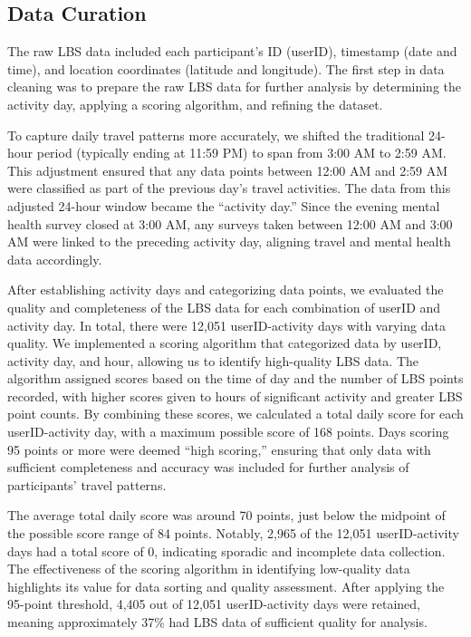 \documentclass[
  letterpaper,
  number,
  review,
  3p]{elsarticle}
\begin{document}
\subsection{Data Curation}\label{data-curation}

The raw LBS data included each participant's ID (userID), timestamp
(date and time), and location coordinates (latitude and longitude). The
first step in data cleaning was to prepare the raw LBS data for further
analysis by determining the activity day, applying a scoring algorithm,
and refining the dataset.

To capture daily travel patterns more accurately, we shifted the
traditional 24-hour period (typically ending at 11:59 PM) to span from
3:00 AM to 2:59 AM. This adjustment ensured that any data points between
12:00 AM and 2:59 AM were classified as part of the previous day's
travel activities. The data from this adjusted 24-hour window became the
``activity day.'' Since the evening mental health survey closed at 3:00
AM, any surveys taken between 12:00 AM and 3:00 AM were linked to the
preceding activity day, aligning travel and mental health data
accordingly.

After establishing activity days and categorizing data points, we
evaluated the quality and completeness of the LBS data for each
combination of userID and activity day. In total, there were 12,051
userID-activity days with varying data quality. We implemented a scoring
algorithm that categorized data by userID, activity day, and hour,
allowing us to identify high-quality LBS data. The algorithm assigned
scores based on the time of day and the number of LBS points recorded,
with higher scores given to hours of significant activity and greater
LBS point counts. By combining these scores, we calculated a total daily
score for each userID-activity day, with a maximum possible score of 168
points. Days scoring 95 points or more were deemed ``high scoring,''
ensuring that only data with sufficient completeness and accuracy was
included for further analysis of participants' travel patterns.

The average total daily score was around 70 points, just below the
midpoint of the possible score range of 84 points. Notably, 2,965 of the
12,051 userID-activity days had a total score of 0, indicating sporadic
and incomplete data collection. The effectiveness of the scoring
algorithm in identifying low-quality data highlights its value for data
sorting and quality assessment. After applying the 95-point threshold,
4,405 out of 12,051 userID-activity days were retained, meaning
approximately 37\% had LBS data of sufficient quality for analysis.
\end{document}
